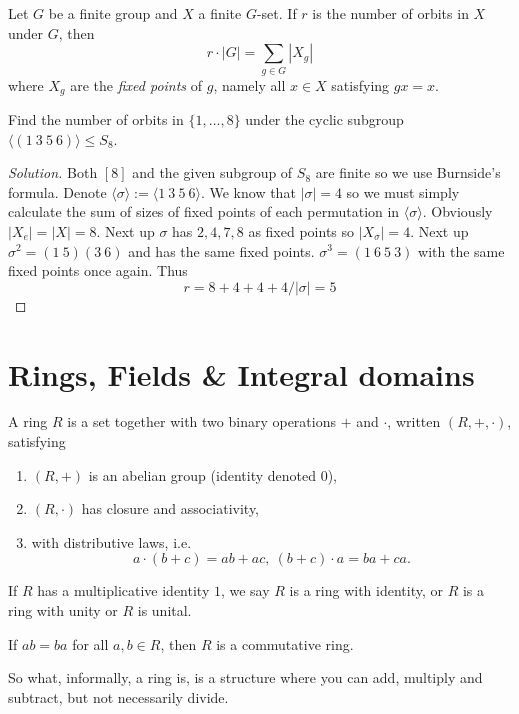 \newpage 
 \begin{thm}
     Let $G$ be a finite group and $X$ a finite $G$-set. If 
     $r$ is the number of orbits in $X$ under $G$, then 
     \[
        r \cdot |G| = \displaystyle\sum_{g \in G}|X_g|
     \]
     where $X_g$ are the \emph{fixed points} of $g$, namely 
     all $x \in X$ satisfying $gx = x$. 
 \end{thm}
 \begin{prob}
    Find the number of orbits in $\{1,\ldots, 8\}$ under the 
    cyclic subgroup $\langle (1 \ 3 \ 5 \ 6) \rangle \leq S_8$.
 \end{prob}
 \begin{proof}[Solution]

    Both $[8]$ and the given subgroup of $S_8$ are finite so we 
    use Burnside's formula. Denote 
    $\langle \sigma \rangle := \langle 1 \ 3 \ 5 \ 6\rangle$. 
    We know that $|\sigma| = 4$ so we must simply calculate 
    the sum of sizes of fixed points of each permutation in 
    $\langle \sigma \rangle$. Obviously $|X_e| = |X| = 8$.   
    Next up $\sigma$ has $2,4,7,8$ as fixed points so 
    $|X_\sigma| = 4$. Next up $\sigma^2 = (1 \ 5)(3 \ 6)$ and has 
    the same fixed points. $\sigma^3 = (1 \ 6 \ 5 \ 3)$ with 
    the same fixed points once again. Thus 
    \[
        r = 8 + 4 + 4 + 4  / |\sigma| = 5
    \]
 \end{proof}

 \newpage 
 \section{Rings, Fields \& Integral domains}
 \begin{defn}[Ring]
     A ring $R$ is a set together with two binary operations 
     $+$ and $\cdot$, written $(R, +, \cdot)$, satisfying 
     \begin{enumerate}
        \item $(R,+)$ is an abelian group (identity denoted $0$), 
        \item $(R,\cdot)$ has closure and associativity, 
        \item with distributive laws, i.e. 
            \[
                a \cdot (b + c) = ab + ac, \ (b+c) \cdot a = 
                ba + ca. 
            \]
     \end{enumerate}
     If $R$ has a multiplicative identity $1$, we say 
     $R$ is a ring with identity, or $R$ is a ring with unity 
     or $R$ is unital. 

     If $ab = ba$ for all $a,b \in R$, then $R$ is a commutative ring.
 \end{defn}
 So what, informally, a ring is, is a structure where you can 
 add, multiply and subtract, but not necessarily divide. 

